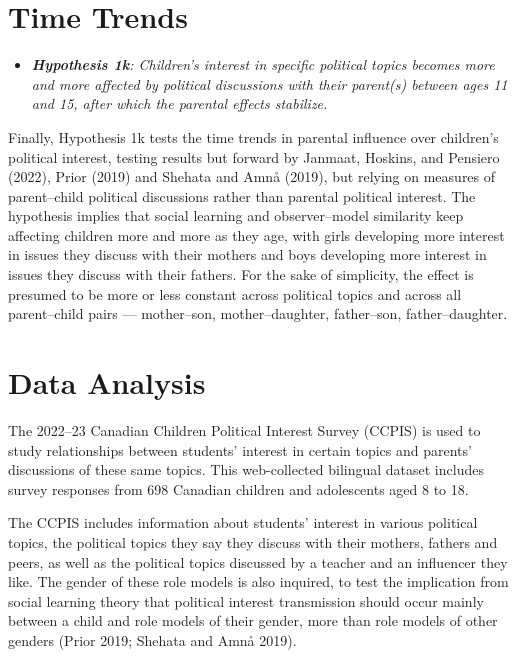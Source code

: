 \documentclass[
  letterpaper,
  DIV=11,
  numbers=noendperiod]{scrreprt}
\providecommand{\tightlist}{%
  \setlength{\itemsep}{0pt}\setlength{\parskip}{0pt}}\usepackage{longtable,booktabs,array}
\begin{document}
\hypertarget{time-trends}{%
\section{Time Trends}\label{time-trends}}

\begin{itemize}
\tightlist
\item
  \emph{\textbf{Hypothesis 1k}: Children's interest in specific
  political topics becomes more and more affected by political
  discussions with their parent(s) between ages 11 and 15, after which
  the parental effects stabilize.}
\end{itemize}

Finally, Hypothesis 1k tests the time trends in parental influence over
children's political interest, testing results but forward by Janmaat,
Hoskins, and Pensiero (2022), Prior (2019) and Shehata and Amnå (2019),
but relying on measures of parent--child political discussions rather
than parental political interest. The hypothesis implies that social
learning and observer--model similarity keep affecting children more and
more as they age, with girls developing more interest in issues they
discuss with their mothers and boys developing more interest in issues
they discuss with their fathers. For the sake of simplicity, the effect
is presumed to be more or less constant across political topics and
across all parent--child pairs --- mother--son, mother--daughter,
father--son, father--daughter.

\hypertarget{data-analysis-1}{%
\section{Data Analysis}\label{data-analysis-1}}

The 2022--23 Canadian Children Political Interest Survey (CCPIS) is used
to study relationships between students' interest in certain topics and
parents' discussions of these same topics. This web-collected bilingual
dataset includes survey responses from 698 Canadian children and
adolescents aged 8 to 18.

The CCPIS includes information about students' interest in various
political topics, the political topics they say they discuss with their
mothers, fathers and peers, as well as the political topics discussed by
a teacher and an influencer they like. The gender of these role models
is also inquired, to test the implication from social learning theory
that political interest transmission should occur mainly between a child
and role models of their gender, more than role models of other genders
(Prior 2019; Shehata and Amnå 2019).
\end{document}
